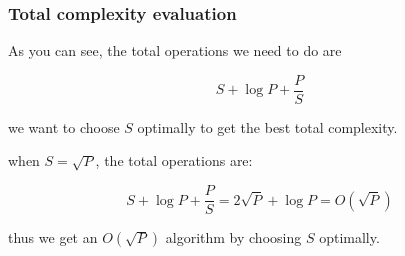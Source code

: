 \begin{frame}
\frametitle{Total complexity evaluation}
As you can see, the total operations we need to do are

\[S + \log P + \frac{P}{S}\]

we want to choose $S$ optimally to get the best total complexity.

\bigskip
when $S = \sqrt{P}$, the total operations are:

\[S + \log P + \frac{P}{S} = 2\sqrt{P} + \log P = O(\sqrt{P})\]

thus we get an $O(\sqrt{P})$ algorithm by choosing $S$ optimally.
\end{frame}